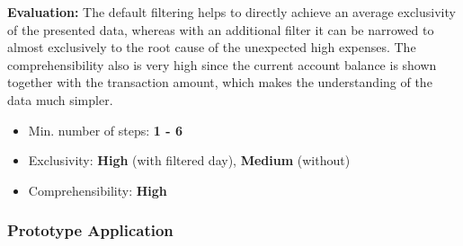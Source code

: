 \textbf{Evaluation:} The default filtering helps to directly achieve an average exclusivity of the presented data, whereas with an additional filter it can be narrowed to almost exclusively to the root cause of the unexpected high expenses. The comprehensibility also is very high since the current account balance is shown together with the transaction amount, which makes the understanding of the data much simpler.
\begin{itemize}[noitemsep,nolistsep]
	\item Min. number of steps: \textbf{1 - 6}
	\item Exclusivity: \textbf{High} (with filtered day), \textbf{Medium} (without)
	\item Comprehensibility: \textbf{High}
\end{itemize}



\subsubsection{Prototype Application}

